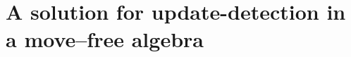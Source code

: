 \section{A solution for update-detection in a move--free algebra}
\label{app:update-move}

\begin{comment}
\subsection{A simple way}
A ``simple way'' means that when determining the commands which lead from
the
original to the present state of the filesystems we do not use commands
like moving a whole subtree or removing a subtree. Commands only allowed
at leaves of the tree of the filesystem, e.g. files or directories
containing no files.

Consider the original state, called \(O\) and the present state called
\(A\). In order to be able to determine the \emph{move} operations, we'd
like to compare the containings of two files in the original and in the
present state. It doesn't mean that we have to store the original
filesystem. This can be achieved by a method called
\emph{data--fingerprint} with which we can compare contents of files
without comparing the whole amount of data stored in them. 

A function called \(origin(\pi)\) gives
us a path for a file in the filesystem \(O\) which has the same contents 
as the file \(A\cdot\pi\), or empty--file (\(\perp\)) if such a file does
not exist. Note that more files may be found in \(O\) with the same
contents.

Another function, \(\#(\pi)\) gives the number of paths \(\varphi\) for
which \(origin(\varphi)=\pi\) holds.

Then to gain a possible sequence of commands, compare \(O\cdot\pi\) and
\(A\cdot\pi\). (For this purpose, we can use timestamps, inode numbers,
or any other data on files provided by the operation system.) 
If they're the same, we
don't need to do anything. If not, we have three cases. First, if the
file \(A\cdot\pi\) has been deleted, we can delete this file iff
\(\#(\pi)=0\). If the file exists in \(A\) it may have an origin or not.
If it has, and \(\#(\pi)=0\), than we can \emph{move} \(origin(\pi)\) to
\(\pi\) iff \(\#(origin(\pi))=1\), or \emph{copy} it if
\(\#(origin(\pi))>1\). In both cases, we should decrease
\(\#(origin(\pi))\) by one.

If we couldn't do anything because \(\#(\pi)\) was greater than \(0\), we
can do one of the followings: wait till it decreases due to another
commands, or, if there's a \emph{loop} of file displacings (for example
\(origin(a)=b\) and \(origin(b)=a\)) than we should rename the origin of
one of the files in order to be able to continue (solving the
example: \emph{move} \(b\to b^\prime\), \(a\to b\) and \(b^\prime\to
a\)).

That way we gained a possible sequence of commands which if we apply
to 
filesystem \(O\) we'll get filesystem \(A\).
\end{comment}

